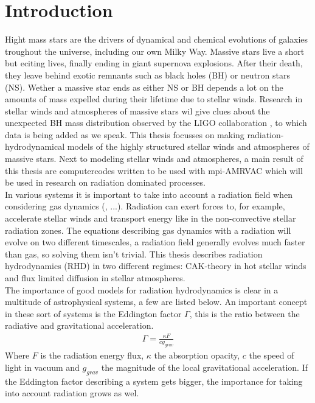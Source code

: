 \chapter{Introduction}
Hight mass stars are the drivers of dynamical and chemical evolutions of galaxies troughout the universe, including our own Milky Way. Massive stars live a short but eciting lives, finally ending in giant supernova explosions. After their death, they leave behind exotic remnants such as black holes (BH) or neutron stars (NS). Wether a massive star ends as either NS or BH depends a lot on the amounts of mass expelled during their lifetime due to stellar winds. Research in stellar winds and atmospheres of massive stars wil give clues about the unexpected BH mass distribution observed by the LIGO collaboration \cite{Abbott1}, to which data is being added as we speak. This thesis focusses on making radiation-hydrodynamical models of the highly structured stellar winds and atmospheres of massive stars. Next to modeling stellar winds and atmospheres, a main result of this thesis are computercodes written to be used with mpi-AMRVAC which will be used in research on radiation dominated processes.\\

In various systems it is important to take into account a radiation field when considering gas dynamics (\cite{Tetsu2016},  ...). Radiation can exert forces to, for example, accelerate stellar winds and transport energy like in the non-convective stellar radiation zones. The equations describing gas dynamics with a radiation will evolve on two different timescales, a radiation field generally evolves much faster than gas, so solving them isn't trivial. This thesis describes radiation hydrodynamics (RHD) in two different regimes: CAK-theory in hot stellar winds and flux limited diffusion in stellar atmospheres.\\

The importance of good models for radiation hydrodynamics is clear in a multitude of astrophysical systems, a few are listed below. An important concept in these sort of systems is the Eddington factor $\Gamma$, this is the ratio between the radiative and gravitational acceleration.
\begin{align}
	\Gamma = \frac{\kappa F}{c g_{grav}}
\end{align}
Where $F$ is the radiation energy flux, $\kappa$ the absorption opacity, $c$ the speed of light in vacuum and $g_{grav}$ the magnitude of the local gravitational acceleration. If the Eddington factor describing a system gets bigger, the importance for taking into account radiation grows as wel.


